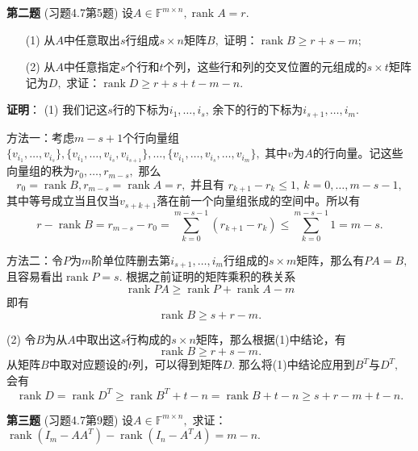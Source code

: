 \fi  %

\newpageorvspace

{\bf 第二题} (习题4.7第5题) 设$A \in \mathbb{F}^{m\times n}, \operatorname{rank} A = r.$
\begin{itemize}
\item[(1)] 从$A$中任意取出$s$行组成$s\times n$矩阵$B,$ 证明：$\operatorname{rank} B \geqslant r + s - m;$
\item[(2)] 从$A$中任意指定$s$个行和$t$个列，这些行和列的交叉位置的元组成的$s\times t$矩阵记为$D,$ 求证：$\operatorname{rank} D \geqslant r + s + t - m - n.$
\end{itemize}

\ifIncludeAnswer

\newpageorvspace

\textbf{证明}： (1) 我们记这$s$行的下标为$i_1, \ldots, i_s$, 余下的行的下标为$i_{s+1}, \ldots, i_m.$

方法一：考虑$m-s+1$个行向量组$\{v_{i_1}, \ldots, v_{i_s}\}, \{v_{i_1}, \ldots, v_{i_s}, v_{i_{s+1}}\}, \ldots, \{v_{i_1}, \ldots, v_{i_s}, \ldots, v_{i_m}\},$ 其中$v$为$A$的行向量。记这些向量组的秩为$r_0, \ldots, r_{m-s},$ 那么
$$r_0 = \operatorname{rank} B, r_{m-s} = \operatorname{rank} A = r, \text{ 并且有 } r_{k+1} - r_k \leqslant 1, ~ k = 0, \ldots, m-s-1,$$
其中等号成立当且仅当$v_{s+k+1}$落在前一个向量组张成的空间中。所以有
$$r - \operatorname{rank} B = r_{m-s} - r_0 = \sum\limits_{k=0}^{m-s-1} (r_{k+1} - r_k) \leqslant \sum\limits_{k=0}^{m-s-1} 1 = m-s.$$

方法二：令$P$为$m$阶单位阵删去第$i_{s+1}, \ldots, i_m$行组成的$s\times m$矩阵，那么有$PA = B,$ 且容易看出$\operatorname{rank} P = s.$ 根据之前证明的矩阵乘积的秩关系
$$\operatorname{rank} PA \geqslant \operatorname{rank} P + \operatorname{rank} A - m$$
即有
$$\operatorname{rank} B \geqslant s + r - m.$$

(2) 令$B$为从$A$中取出这$s$行构成的$s\times n$矩阵，那么根据(1)中结论，有
$$\operatorname{rank} B \geqslant r+s-m.$$
从矩阵$B$中取对应题设的$t$列，可以得到矩阵$D.$ 那么将(1)中结论应用到$B^T$与$D^T,$ 会有
$$\operatorname{rank} D = \operatorname{rank} D^T \geqslant \operatorname{rank} B^T + t - n = \operatorname{rank} B + t - n \geqslant s + r - m + t - n.$$


\fi  %

\newpageorvspace

{\bf 第三题} (习题4.7第9题) 设$A \in \mathbb{F}^{m\times n},$ 求证：$\operatorname{rank}(I_m - AA^T) - \operatorname{rank}(I_n - A^TA) = m - n.$

